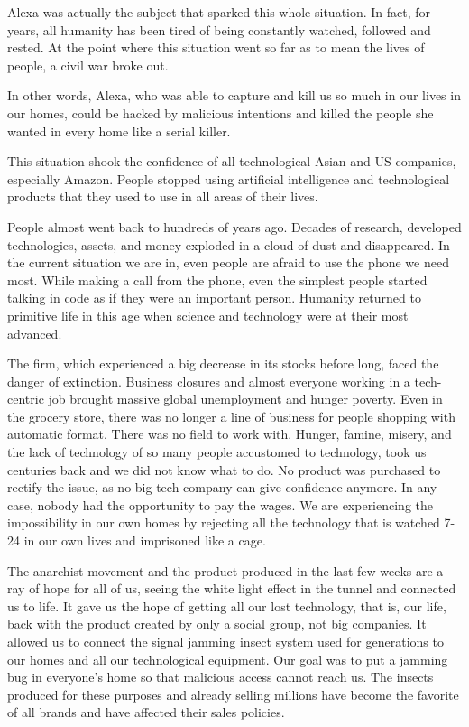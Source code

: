 \documentclass[]{book}
\begin{document}
Alexa was actually the subject that sparked this whole situation. In fact, for years, all humanity has been tired of being constantly watched, followed and rested. At the point where this situation went so far as to mean the lives of people, a civil war broke out.

In other words, Alexa, who was able to capture and kill us so much in our lives in our homes, could be hacked by malicious intentions and killed the people she wanted in every home like a serial killer.

This situation shook the confidence of all technological Asian and US companies, especially Amazon. People stopped using artificial intelligence and technological products that they used to use in all areas of their lives.

People almost went back to hundreds of years ago. Decades of research, developed technologies, assets, and money exploded in a cloud of dust and disappeared. In the current situation we are in, even people are afraid to use the phone we need most. While making a call from the phone, even the simplest people started talking in code as if they were an important person. Humanity returned to primitive life in this age when science and technology were at their most advanced.

The firm, which experienced a big decrease in its stocks before long, faced the danger of extinction. Business closures and almost everyone working in a tech-centric job brought massive global unemployment and hunger poverty. Even in the grocery store, there was no longer a line of business for people shopping with automatic format. There was no field to work with. Hunger, famine, misery, and the lack of technology of so many people accustomed to technology, took us centuries back and we did not know what to do. No product was purchased to rectify the issue, as no big tech company can give confidence anymore. In any case, nobody had the opportunity to pay the wages. We are experiencing the impossibility in our own homes by rejecting all the technology that is watched 7-24 in our own lives and imprisoned like a cage.

The anarchist movement and the product produced in the last few weeks are a ray of hope for all of us, seeing the white light effect in the tunnel and connected us to life. It gave us the hope of getting all our lost technology, that is, our life, back with the product created by only a social group, not big companies. It allowed us to connect the signal jamming insect system used for generations to our homes and all our technological equipment. Our goal was to put a jamming bug in everyone's home so that malicious access cannot reach us. The insects produced for these purposes and already selling millions have become the favorite of all brands and have affected their sales policies.
\end{document}
